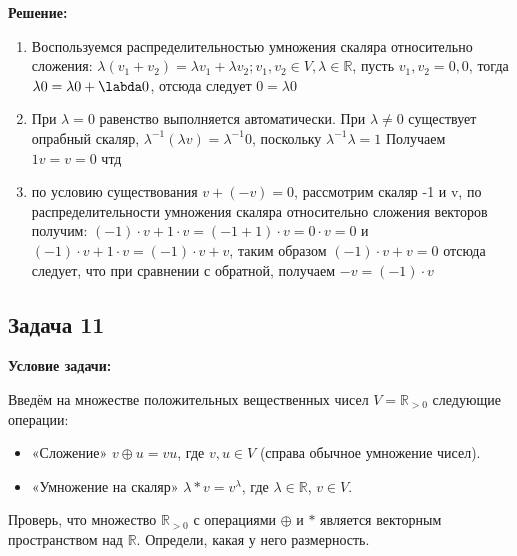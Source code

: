 \documentclass[a4paper,12pt]{article}
\begin{document}
\textbf{Решение: }
\begin{enumerate}

\item Воспользуемся распределительностью умножения скаляра относительно сложения: $\lambda (v_1+v_2)=\lambda v_1 + \lambda v_2; v_1, v_2 \in V, \lambda \in \mathbb{R}$, пусть $v_1, v_2 = 0, 0$, тогда $\lambda 0 = \lambda 0 + \labda 0$, отсюда следует $0 = \lambda 0$

\item При $\lambda = 0$ равенство выполняется автоматически. При $\lambda \ne 0$ существует опрабный скаляр, $\lambda^{-1}(\lambda v)=\lambda^{-1} 0$, поскольку $\lambda^{-1}\lambda = 1$ Получаем $1v=v=0$ чтд

\item по условию существования $v+(-v)=0$, рассмотрим скаляр -1 и v, по распределительности умножения скаляра относительно сложения векторов получим: $(−1)⋅v+1⋅v=(−1+1)⋅v=0⋅v=0$ и $(−1)⋅v+1⋅v=(−1)⋅v+v$, таким образом $(−1)⋅v+v=0$ отсюда следует, что при сравнении с обратной, получаем $−v=(−1)⋅v$
\end{enumerate}
\vspace{0.5cm}

\subsection{Задача 11}

\textbf{Условие задачи:}

Введём на множестве положительных вещественных чисел $V = \mathbb{R}_{>0}$ следующие операции:

\begin{itemize}
    \item «Сложение» $v \oplus u = vu$, где $v, u \in V$ (справа обычное умножение чисел).
    \item «Умножение на скаляр» $\lambda \ast v = v^\lambda$, где $\lambda \in \mathbb{R}$, $v \in V$.
\end{itemize}

Проверь, что множество $\mathbb{R}_{>0}$ с операциями $\oplus$ и $\ast$ является векторным пространством над $\mathbb{R}$. Определи, какая у него размерность.
\end{document}
